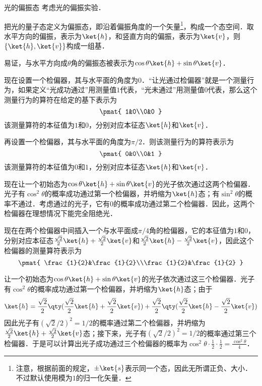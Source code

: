 \begin{example}{光的偏振态}\label{QMPrcp_ex3}
考虑光的偏振实验．

把光的量子态定义为偏振态，即沿着偏振角度的一个矢量\footnote{注意，根据前面的规定，$\pm\ket{s}$表示同一个态，因此无所谓正负、大小．不过默认使用模为$1$的归一化矢量．}，构成一个态空间．取水平方向的偏振，表示为$\ket{h}$，和竖直方向的偏振，表示为$\ket{v}$，则$\{\ket{h}, \ket{v}\}$构成一组基．

易证，与水平方向成$\theta$角的偏振态被表示为$\cos\theta\ket{h}+\sin\theta\ket{v}$．

现在设置一个检偏器，其与水平面的角度为$0$．“让光通过检偏器”就是一个测量行为，如果定义“光成功通过”用测量值$1$代表，“光未通过”用测量值$0$代表，那么这个测量行为的算符在给定的基下表示为
\begin{equation}
\pmat{
    1&0\\0&0
}
\end{equation}
该测量算符的本征值为$1$和$0$，分别对应本征态$\ket{h}$和$\ket{v}$．

再设置一个检偏器，其与水平面的角度为$\pi/2$．则该测量行为的算符表示为
\begin{equation}
\pmat{
    0&0\\0&1
}
\end{equation}
该测量算符的本征值为$0$和$1$，分别对应本征态$\ket{h}$和$\ket{v}$．

现在让一个初始态为$\cos\theta\ket{h}+\sin\theta\ket{v}$的光子依次通过这两个检偏器．光子有$\cos^2\theta$的概率成功通过第一个检偏器，并坍缩为$\ket{h}$态；有$\sin^2\theta$的概率不通过．考虑通过的光子，它有$0$的概率成功通过第二个检偏器．因此，这两个检偏器在理想情况下能完全阻绝光．

现在在两个检偏器中间插入一个与水平面成$\pi/4$角的检偏器，它的本征值为$1$和$0$，分别对应本征态$\frac{\sqrt{2}}{2}\ket{h}+\frac{\sqrt{2}}{2}\ket{v}$和$\frac{\sqrt{2}}{2}\ket{h}-\frac{\sqrt{2}}{2}\ket{v}$，因此这个检偏器的测量算符表示为
\begin{equation}
\pmat{
    \frac{1}{2}&\frac{1}{2}\\\frac{1}{2}&\frac{1}{2}
}
\end{equation}

让一个初始态为$\cos\theta\ket{h}+\sin\theta\ket{v}$的光子依次通过这三个检偏器．光子有$\cos^2\theta$的概率成功通过第一个检偏器，并坍缩为$\ket{h}$态；由于
\begin{equation}
\ket{h}=\frac{\sqrt{2}}{2}\qty(\frac{\sqrt{2}}{2}\ket{h}+\frac{\sqrt{2}}{2}\ket{v})+\frac{\sqrt{2}}{2}\qty(\frac{\sqrt{2}}{2}\ket{h}-\frac{\sqrt{2}}{2}\ket{v})
\end{equation}
因此光子有$(\sqrt{2}/2)^2=1/2$的概率通过第二个检偏器，并坍缩为$\frac{\sqrt{2}}{2}\ket{h}+\frac{\sqrt{2}}{2}\ket{v}$态；接下来，光子有$(\sqrt{2}/2)^2=1/2$的概率通过第三个检偏器．于是可以计算出光子成功通过三个检偏器的概率为$\cos^2\theta\cdot\frac{1}{2}\cdot\frac{1}{2}=\frac{\cos^2\theta}{4}$．

\end{example}


